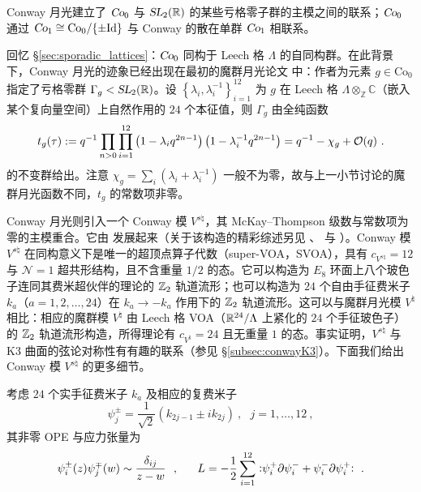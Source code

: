 Conway 月光建立了 $\operatorname{\textsl{Co}}_0$ 与 $\operatorname{\textsl{SL}}_2(\mathbb{R})$ 的某些亏格零子群的主模之间的联系；$\operatorname{\textsl{Co}}_0$ 通过 $\operatorname{\textsl{Co}}_1\cong\text{Co}_0/\lbrace\pm\text{Id}\rbrace$ 与 Conway 的散在单群 $\operatorname{\textsl{Co}}_1$ 相联系。

回忆 \S\ref{sec:sporadic_lattices}：$\operatorname{\textsl{Co}}_0$ 同构于 Leech 格 $\Lambda$ 的自同构群。在此背景下，Conway 月光的迹象已经出现在最初的魔群月光论文 \cite{conway_norton} 中：作者为元素 $g\in\text{Co}_0$ 指定了亏格零群 $\Gamma_g<\operatorname{\textsl{SL}}_2(\mathbb{R})$。设 $\left\lbrace\lambda_i,\lambda_i^{-1}\right\rbrace_{i=1}^{12}$ 为 $g$ 在 Leech 格 $\Lambda\otimes_{\mathbb{Z}}\mathbb{C}$（嵌入某个复向量空间）上自然作用的 $24$ 个本征值，则 $\Gamma_g$ 由全纯函数
\begin{equation}
t_g(\tau):=q^{-1}\prod_{n>0}\prod_{i=1}^{12}\left(1-\lambda_iq^{2n-1}\right)\left(1-\lambda_i^{-1}q^{2n-1}\right)=q^{-1}-\chi_g+\mathcal{O}(q)~. 
\end{equation}
的不变群给出。注意 $\chi_g = \sum_i (\lambda_i+\lambda_i^{-1})$ 一般不为零，故与上一小节讨论的魔群月光函数不同，$t_g$ 的常数项非零。


Conway 月光则引入一个 Conway 模 $V^{s\natural}$，其 McKay–Thompson 级数与常数项为零的主模重合。它由 \cite{DuncanJohnF.2007SfCl, DuncanJohnf.r.2015TMMF} 发展起来（关于该构造的精彩综述另见 \cite{MR3465528}、\cite{Cheng:2014owa} 与 \cite{Harrison:2018joy}）。Conway 模 $V^{s\natural}$ 在同构意义下是唯一的超顶点算子代数（super-VOA，SVOA），具有 $c_{V^{s\natural}}=12$ 与 $\mathcal{N}=1$ 超共形结构，且不含重量 $1/2$ 的态。它可以构造为 $E_8$ 环面上八个玻色子连同其费米超伙伴的理论的 $\mathbb{Z}_2$ 轨道流形；也可以构造为 $24$ 个自由手征费米子 $k_a$（$a=1,2,\dots,24$）在 $k_a \to -k_a$ 作用下的 $\mathbb{Z}_2$ 轨道流形。这可以与魔群月光模 $V^\natural$ 相比：相应的魔群模 $V^\natural$ 由 Leech 格 VOA（$\mathbb{R}^{24}/\Lambda$ 上紧化的 $24$ 个手征玻色子）的 $\mathbb{Z}_2$ 轨道流形构造，所得理论有 $c_{V^\natural}=24$ 且无重量 $1$ 的态。事实证明，$V^{s\natural}$ 与 K3 曲面的弦论对称性有有趣的联系（参见 \S\ref{subsec:conwayK3}）。下面我们给出 Conway 模 $V^{s\natural}$ 的更多细节。


考虑 $24$ 个实手征费米子 $k_a$ 及相应的复费米子
\begin{equation}
\psi^\pm_j=\frac{1}{\sqrt{2}}\left(k_{2j-1}\pm ik_{2j}\right)~,~~~j=1,\dots,12~, 
\end{equation}
其非零 OPE 与应力张量为
\begin{equation}
\psi^\pm_i(z)\psi^\mp_j(w)\sim\frac{\delta_{ij}}{z-w}~~,~~~~~L=-\frac{1}{2}\sum_{i=1}^{12}\vcentcolon\mathrel{\psi_i^+\partial\psi_i^- + \psi_i^-\partial\psi_i^+}\vcentcolon~.
\end{equation}


